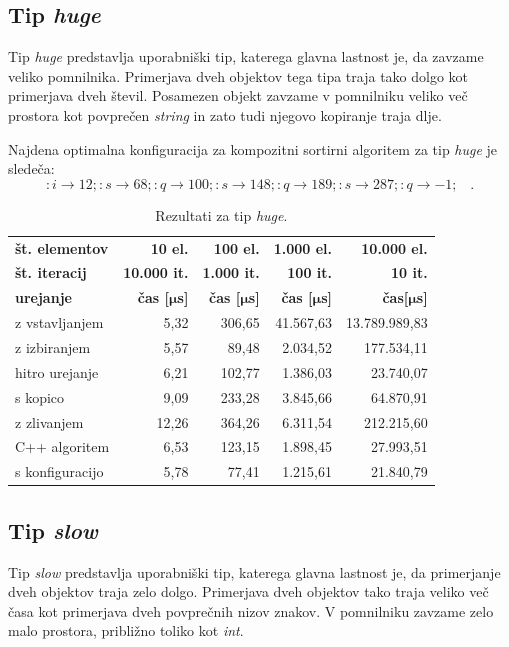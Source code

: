 \documentclass[a4paper,oneside,12pt]{article}
\newcommand{\lra}{\ensuremath{\longrightarrow}}
\newcommand{\edot}{\;\;\;.}
\newcommand{\bmu}{\ensuremath{\boldsymbol{\mu}}}
\newcommand{\usec}{\ensuremath{\bmu}s}
\begin{document}
\subsection{Tip \emph{huge}}
Tip \emph{huge} predstavlja uporabniški tip, katerega glavna lastnost je, da zavzame veliko pomnilnika.
Primerjava dveh objektov tega tipa traja tako dolgo kot primerjava dveh števil. Posamezen objekt
zavzame v pomnilniku veliko več prostora kot povprečen \emph{string} in zato tudi njegovo kopiranje 
traja dlje.

Najdena optimalna konfiguracija za kompozitni sortirni algoritem za tip \emph{huge} je sledeča:
\[ :i \lra 12;:s \lra 68;:q \lra 100;:s \lra 148;:q \lra 189;:s \lra 287;:q \lra -1; \edot \]

\begin{table}[h]
  \centering
  \caption{Rezultati za tip \emph{huge}.}
  \label{tab:rez:huge} \vspace{1ex}
  \begin{tabular}{l!{\vrule width 1pt}r|r|r|r}
    \bf št. elementov  & \bf 10 el.& \bf 100 el.& \bf 1.000 el. & \bf 10.000 el. \\ 
    \bf št. iteracij   & \bf 10.000 it. & \bf 1.000 it. & \bf 100 it. & \bf 10 it. \\ \hline
    \bf urejanje       & \bf čas [\usec] & \bf čas [\usec] & \bf čas [\usec] & \bf čas[\usec] \\  
    z vstavljanjem     &  5,32 & 306,65 & 41.567,63 & 13.789.989,83 \\ \hline
    z izbiranjem       &  5,57 &  89,48 &  2.034,52 &    177.534,11 \\ \hline
    hitro urejanje     &  6,21 & 102,77 &  1.386,03 &     23.740,07 \\ \hline
    s kopico           &  9,09 & 233,28 &  3.845,66 &     64.870,91 \\ \hline
    z zlivanjem        & 12,26 & 364,26 &  6.311,54 &    212.215,60 \\ \hline
    C++ algoritem      &  6,53 & 123,15 &  1.898,45 &     27.993,51 \\ \hline
    s konfiguracijo    &  5,78 &  77,41 &  1.215,61 &     21.840,79 \\ 
  \end{tabular}
\end{table}

\subsection{Tip \emph{slow}}
Tip \emph{slow} predstavlja uporabniški tip, katerega glavna lastnost je, da primerjanje dveh objektov
traja zelo dolgo. Primerjava dveh objektov tako traja veliko več časa kot primerjava dveh povprečnih
nizov znakov. V pomnilniku zavzame zelo malo prostora, približno toliko kot \emph{int}.
\end{document}
